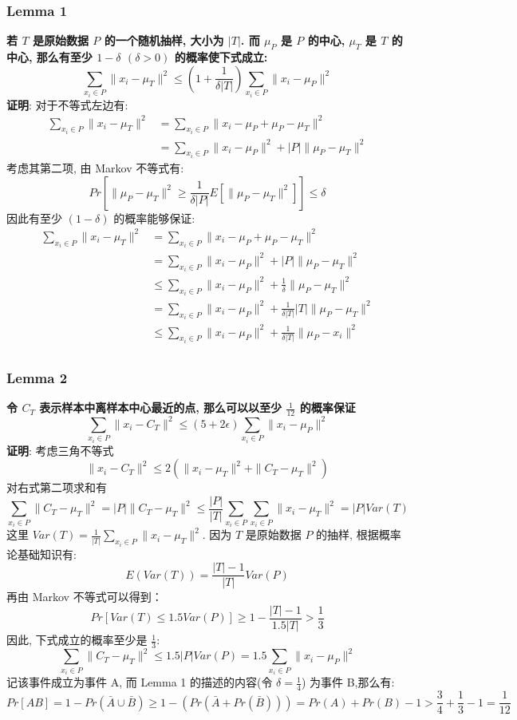 \documentclass[UTF8]{article}
\begin{document}
\subsubsection*{Lemma 1}
\noindent \textbf{若 $T$ 是原始数据 $P$ 的一个随机抽样, 大小为 $|T|$. 而 $\mu_P$ 是 $P$ 的中心, $\mu_T$ 是 $T$ 的中心, 那么有至少 $1-\delta$ $(\delta > 0)$ 的概率使下式成立:
$$\sum\limits_{x_i \in P}\|x_i-\mu_T\|^2 \le (1+\frac{1}{\delta|T|})\sum\limits_{x_i\in P}\|x_i-\mu_P\|^2$$}
\noindent
\textbf{证明}: 对于不等式左边有:
\begin{align*}
	\sum\limits_{x_i \in P}\|x_i-\mu_T\|^2
	&=\sum\limits_{x_i \in P} \|x_i-\mu_P + \mu_P -\mu_T\|^2 \\
	&=\sum\limits_{x_i \in P} \|x_i-\mu_P\|^2 + |P|\|\mu_P -\mu_T\|^2
\end{align*}
考虑其第二项, 由 Markov 不等式有:
$$Pr\left[\|\mu_P -\mu_T\|^2 \ge \frac{1}{\delta |P|}E[\|\mu_P -\mu_T\|^2]\right] \le \delta$$
因此有至少 $(1-\delta)$ 的概率能够保证:
\begin{align*}
	\sum\limits_{x_i \in P}\|x_i-\mu_T\|^2
	&=\sum\limits_{x_i \in P} \|x_i-\mu_P + \mu_P -\mu_T\|^2 \\
	&=\sum\limits_{x_i \in P} \|x_i-\mu_P\|^2 + |P|\|\mu_P -\mu_T\|^2 \\
	&\le \sum\limits_{x_i \in P} \|x_i-\mu_P\|^2 + \frac{1}{\delta}\|\mu_P -\mu_T\|^2 \\
	&= \sum\limits_{x_i \in P} \|x_i-\mu_P\|^2 + \frac{1}{\delta |T|}|T|\|\mu_P -\mu_T\|^2 \\
	&\le \sum\limits_{x_i \in P} \|x_i-\mu_P\|^2 + \frac{1}{\delta |T|}\|\mu_P -x_i\|^2 \\
\end{align*}

\subsubsection*{Lemma 2}
\noindent \textbf{令 $C_T$ 表示样本中离样本中心最近的点, 那么可以以至少 $\frac{1}{12}$ 的概率保证
$$\sum\limits_{x_i\in P}\|x_i-C_T\|^2 \le (5+2\epsilon)\sum\limits_{x_i\in P}\|x_i-\mu_P\|^2$$}
\noindent
\textbf{证明}: 考虑三角不等式
$$\|x_i-C_T\|^2 \le 2(\|x_i-\mu_T\|^2 + \|C_T-\mu_T\|^2)$$
对右式第二项求和有
$$\sum\limits_{x_i \in P}\|C_T-\mu_T\|^2 = |P|\|C_T-\mu_T\|^2 \le \frac{|P|}{|T|}\sum\limits_{x_i \in P}\sum\limits_{x_i \in P}\|x_i - \mu_T\|^2 = |P|Var(T)$$
这里 $Var(T)=\frac{1}{|T|}\sum_{x_i \in P}\|x_i-\mu_T\|^2$. 因为 $T$ 是原始数据 $P$ 的抽样, 根据概率论基础知识有:
$$E(Var(T))=\frac{|T|-1}{|T|}Var(P)$$
再由 Markov 不等式可以得到：
$$Pr[Var(T) \le 1.5Var(P)] \ge 1-\frac{|T|-1}{1.5|T|} > \frac{1}{3}$$
因此, 下式成立的概率至少是 $\frac{1}{3}$:
$$\sum\limits_{x_i\in P}\|C_T-\mu_T\|^2 \le 1.5|P|Var(P) = 1.5\sum\limits_{x_i \in P}\|x_i - \mu_P\|^2$$
记该事件成立为事件 A, 而 Lemma 1 的描述的内容(令 $\delta=\frac{1}{4}$) 为事件 B,那么有:
$$Pr[AB]=1-Pr(\bar{A}\cup\bar{B})\ge1-(Pr(\bar{A}+Pr(\bar{B})))=Pr(A)+Pr(B)-1 > \frac{3}{4} + \frac{1}{3} - 1 = \frac{1}{12}$$
\end{document}
